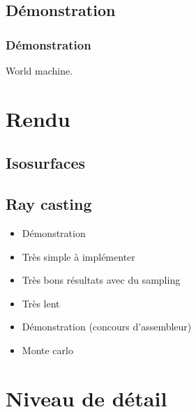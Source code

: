 \documentclass{beamer}
\begin{document}

\subsection{Démonstration}
\begin{frame}
  \frametitle{Démonstration}
  World machine.
\end{frame}

\section{Rendu}

\subsection{Isosurfaces}
\begin{frame}
  
\end{frame}

\subsection{Ray casting}

\begin{frame}
  \begin{itemize}
  \item Démonstration
  \item Très simple à implémenter
  \item Très bons résultats avec du sampling
  \item Très lent
  \item Démonstration (concours d'assembleur)
  \item Monte carlo
  \end{itemize}
\end{frame}

\section[LOD]{Niveau de détail}
\end{document}
